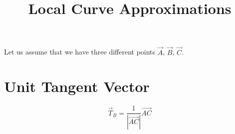 \documentclass[aps,10pt]{revtex4}
\newcommand{\myvec}[1]{\overrightarrow{#1}}
\newcommand{\mynorm}[1]{\left\vert#1\right\vert}
\begin{document}
\title{Local Curve Approximations}
\maketitle


Let us assume that we have three different points $\vec{A}$, $\vec{B}$, $\vec{C}$.

\section{Unit Tangent Vector}

\begin{equation}
	\vec{T}_B = \dfrac{1}{\mynorm{\myvec{AC}}}\myvec{AC}
\end{equation}
\end{document}
